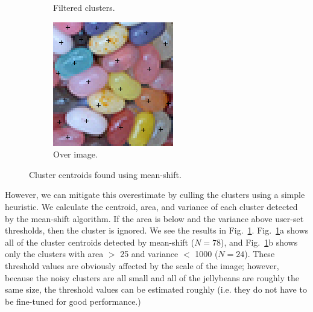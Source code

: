 \documentclass[12pt]{article}
\begin{document}
\begin{figure}
\begin{subfigure}[b]{0.3\textwidth}
      \caption{Filtered clusters.}
  \end{subfigure}
   \begin{subfigure}[b]{0.3\textwidth}
      \includegraphics[width=\textwidth]{fig/ms_clustersoverimage}
      \caption{Over image.}
  \end{subfigure}
  \caption{Cluster centroids found using mean-shift.}
  \label{fig:clusters}
  \end{figure}

However, we can mitigate this overestimate by culling the clusters using a simple heuristic. We calculate the centroid, area, and variance of each cluster detected by the mean-shift algorithm. If the area is below and the variance above user-set thresholds, then the cluster is ignored. We see the results in Fig.~\ref{fig:clusters}. Fig.~\ref{fig:clusters}a shows all of the cluster centroids detected by mean-shift ($N = 78$), and Fig.~\ref{fig:clusters}b shows only the clusters with area $>$ 25 and variance $<$ 1000 ($N = 24$).  These threshold values are obviously affected by the scale of the image; however, because the noisy clusters are all small and all of the jellybeans are roughly the same size, the threshold values can be estimated roughly (i.e. they do not have to be fine-tuned for good performance.)
\end{document}
